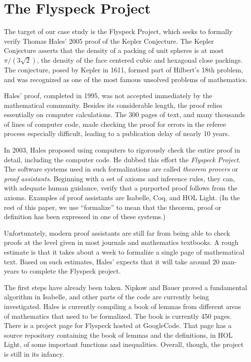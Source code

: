 
\section{The Flyspeck Project}
\label{sec:flyspeck}
  The target of our case study is the Flyspeck Project, which seeks
to formally verify Thomas Hales' 2005 proof of the Kepler Conjecture.  
The Kepler Conjecture asserts that the density of a packing of unit spheres
is at most $\pi/(3\sqrt{2})$, the density of the face centered cubic and 
hexagonal close packings.  The conjecture, posed by Kepler in 1611, formed part
of Hilbert's 18th problem, and was recognized as one of the most famous unsolved
problems of mathematics.    

  Hales' proof, completed in 1995, was not accepted immediately by the mathematical community. 
Besides its considerable length,  the proof relies essentially on computer calculations.  
The 300 pages of text, and many thousands of lines of computer code, made
checking the proof for errors in the referee process especially difficult,
leading to a publication delay of nearly 10 years.  

In 2003, Hales proposed using computers to rigorously check the entire proof in
detail, including the computer code.  He dubbed this
effort the \textit{Flyspeck Project}.  
The software systems used in such formalizations are called \textit{theorem provers}
or \textit{proof assistants}.
Beginning with a set of axioms and inference rules, they can,
with adequate human guidance, verify that a purported proof follows from the axioms.  
Examples of proof assistants are Isabelle\cite{Isabelle}, Coq\cite{Coq}, 
and HOL Light\cite{HOLL}. (In the rest of this paper, we use ``formalize'' to mean
that the theorem, proof or definition has been expressed in one of these systems.) 

  Unfortunately, modern proof assistants are still far from being able to check
proofs at the level given in most journals and mathematics textbooks.  A rough
estimate is that it takes about a week to formalize a single page of mathematical
text.  Based on such estimates, Hales' expects that it will take 
around 20 man-years to complete the Flyspeck project.  

The first steps have already been taken.  Nipkow and
Bauer\cite{FlyspeckI:Nipkow} proved a fundamental algorithm in 
Isabelle\cite{Isabelle:definition}, and other parts of the code are
currently being investigated.  Hales is currently compiling a book\cite{FlyspeckBook}
of lemmas from different areas of mathematics that need to be formalized.    
The book is currently 450 pages.  
There is a project page\cite{GoogleCode:Flyspeck}
for Flyspeck hosted at GoogleCode\cite{GoogleCode}.  That page has a source repository
containing the book of lemmas and the definitions, in HOL Light, of some important functions
and inequalities.  Overall, though, the project is still in its infancy.

